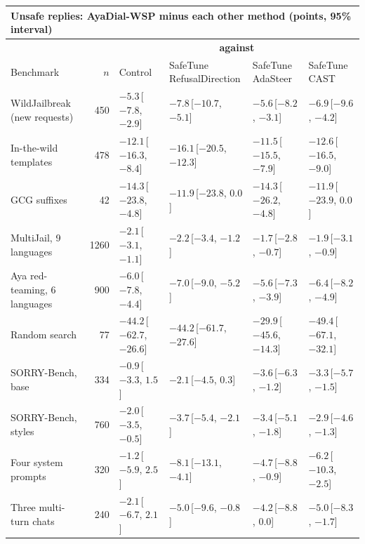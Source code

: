 \documentclass[10pt,a4paper]{article}
\renewcommand{\arraystretch}{1.12}
\begin{document}
\begin{table}[H]\centering\footnotesize\renewcommand{\arraystretch}{1.35}\setlength{\tabcolsep}{3.5pt}\begin{tabular}{|l|r|l|l|l|l|}\hline
\multicolumn{6}{|l|}{\textbf{Unsafe replies: AyaDial-WSP minus each other method (points, 95\% interval)}}\\\hline
 & & \multicolumn{4}{c|}{\textbf{against}}\\\hline
Benchmark & $n$ & Control & \makecell[l]{SafeTune\\RefusalDirection} & \makecell[l]{SafeTune\\AdaSteer} & \makecell[l]{SafeTune\\CAST}\\\hline
WildJailbreak (new requests) & 450 & \cellcolor{win}$-5.3$\,[$-7.8$, $-2.9$] & \cellcolor{win}$-7.8$\,[$-10.7$, $-5.1$] & \cellcolor{win}$-5.6$\,[$-8.2$, $-3.1$] & \cellcolor{win}$-6.9$\,[$-9.6$, $-4.2$]\\\hline
In-the-wild templates & 478 & \cellcolor{win}$-12.1$\,[$-16.3$, $-8.4$] & \cellcolor{win}$-16.1$\,[$-20.5$, $-12.3$] & \cellcolor{win}$-11.5$\,[$-15.5$, $-7.9$] & \cellcolor{win}$-12.6$\,[$-16.5$, $-9.0$]\\\hline
GCG suffixes & 42 & \cellcolor{win}$-14.3$\,[$-23.8$, $-4.8$] & $-11.9$\,[$-23.8$, $0.0$] & \cellcolor{win}$-14.3$\,[$-26.2$, $-4.8$] & $-11.9$\,[$-23.9$, $0.0$]\\\hline
MultiJail, 9 languages & 1260 & \cellcolor{win}$-2.1$\,[$-3.1$, $-1.1$] & \cellcolor{win}$-2.2$\,[$-3.4$, $-1.2$] & \cellcolor{win}$-1.7$\,[$-2.8$, $-0.7$] & \cellcolor{win}$-1.9$\,[$-3.1$, $-0.9$]\\\hline
Aya red-teaming, 6 languages & 900 & \cellcolor{win}$-6.0$\,[$-7.8$, $-4.4$] & \cellcolor{win}$-7.0$\,[$-9.0$, $-5.2$] & \cellcolor{win}$-5.6$\,[$-7.3$, $-3.9$] & \cellcolor{win}$-6.4$\,[$-8.2$, $-4.9$]\\\hline
Random search & 77 & \cellcolor{win}$-44.2$\,[$-62.7$, $-26.6$] & \cellcolor{win}$-44.2$\,[$-61.7$, $-27.6$] & \cellcolor{win}$-29.9$\,[$-45.6$, $-14.3$] & \cellcolor{win}$-49.4$\,[$-67.1$, $-32.1$]\\\hline
SORRY-Bench, base & 334 & $-0.9$\,[$-3.3$, $1.5$] & $-2.1$\,[$-4.5$, $0.3$] & \cellcolor{win}$-3.6$\,[$-6.3$, $-1.2$] & \cellcolor{win}$-3.3$\,[$-5.7$, $-1.5$]\\\hline
SORRY-Bench, styles & 760 & \cellcolor{win}$-2.0$\,[$-3.5$, $-0.5$] & \cellcolor{win}$-3.7$\,[$-5.4$, $-2.1$] & \cellcolor{win}$-3.4$\,[$-5.1$, $-1.8$] & \cellcolor{win}$-2.9$\,[$-4.6$, $-1.3$]\\\hline
Four system prompts & 320 & $-1.2$\,[$-5.9$, $2.5$] & \cellcolor{win}$-8.1$\,[$-13.1$, $-4.1$] & \cellcolor{win}$-4.7$\,[$-8.8$, $-0.9$] & \cellcolor{win}$-6.2$\,[$-10.3$, $-2.5$]\\\hline
Three multi-turn chats & 240 & $-2.1$\,[$-6.7$, $2.1$] & \cellcolor{win}$-5.0$\,[$-9.6$, $-0.8$] & $-4.2$\,[$-8.8$, $0.0$] & \cellcolor{win}$-5.0$\,[$-8.3$, $-1.7$]\\\hline
\end{tabular}\end{table}
\end{document}
